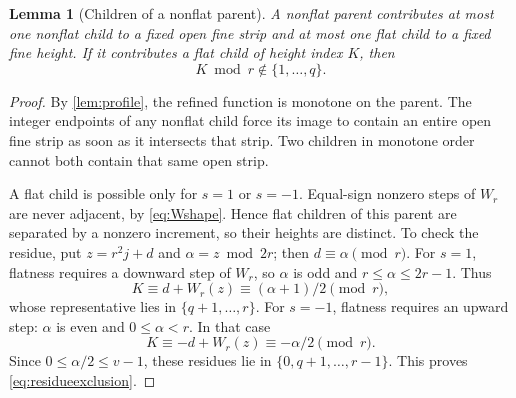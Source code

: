 \documentclass[11pt]{article}
\newtheorem{lemma}[theorem]{Lemma}
\theoremstyle{definition}
\theoremstyle{remark}
\begin{document}
\begin{lemma}[Children of a nonflat parent]\label{lem:nonflatparent}
A nonflat parent contributes at most one nonflat child to a fixed open
fine strip and at most one flat child to a fixed fine height. If it
contributes a flat child of height index $K$, then
\begin{equation}\label{eq:residueexclusion}
 K\bmod r\notin\{1,\ldots,q\}.
\end{equation}
\end{lemma}
\begin{proof}
By \cref{lem:profile}, the refined function is monotone on the parent.
The integer endpoints of any nonflat child force its image to contain an
entire open fine strip as soon as it intersects that strip. Two children
in monotone order cannot both contain that same open strip.

A flat child is possible only for $s=1$ or $s=-1$. Equal-sign nonzero
steps of $W_r$ are never adjacent, by \cref{eq:Wshape}. Hence flat children
of this parent are separated by a nonzero increment, so their heights are
distinct. To check the residue, put $z=r^2j+d$ and
$\alpha=z\bmod2r$; then $d\equiv\alpha\pmod r$.
For $s=1$, flatness requires a downward step of $W_r$, so $\alpha$ is odd
and $r\le\alpha\le2r-1$. Thus
\[
 K\equiv d+W_r(z)\equiv(\alpha+1)/2\pmod r,
\]
whose representative lies in $\{q+1,\ldots,r\}$.
For $s=-1$, flatness requires an upward step: $\alpha$ is even and
$0\le\alpha<r$. In that case
\[
 K\equiv-d+W_r(z)\equiv-\alpha/2\pmod r.
\]
Since $0\le\alpha/2\le v-1$, these residues lie in
$\{0,q+1,\ldots,r-1\}$. This proves \cref{eq:residueexclusion}.
\end{proof}
\end{document}

